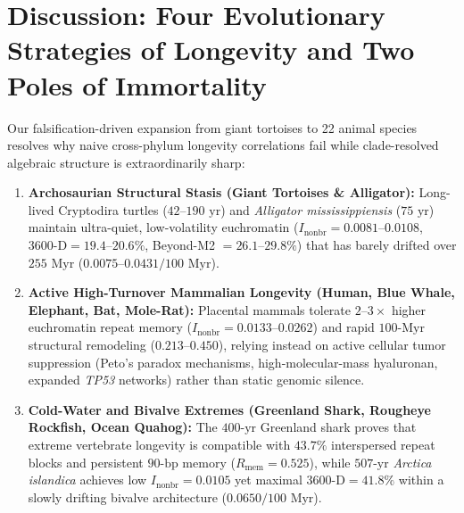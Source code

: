 \documentclass[11pt,a4paper]{article}
\renewcommand{\_}{\origunderscore\penalty200\relax}
\theoremstyle{remark}
\begin{document}
\section{Discussion: Four Evolutionary Strategies of Longevity and Two Poles of Immortality}
Our falsification-driven expansion from giant tortoises to 22 animal species resolves why naive cross-phylum longevity correlations fail while clade-resolved algebraic structure is extraordinarily sharp:
\begin{enumerate}
  \item \textbf{Archosaurian Structural Stasis (Giant Tortoises \& Alligator):} Long-lived Cryptodira turtles ($42\text{--}190\text{ yr}$) and \textit{Alligator mississippiensis} ($75\text{ yr}$) maintain ultra-quiet, low-volatility euchromatin ($I_{\mathrm{nonbr}} = 0.0081\text{--}0.0108$, $3600\text{-D} = 19.4\text{--}20.6\%$, Beyond-M2 $= 26.1\text{--}29.8\%$) that has barely drifted over $255\text{ Myr}$ ($0.0075\text{--}0.0431 / 100\text{ Myr}$).
  \item \textbf{Active High-Turnover Mammalian Longevity (Human, Blue Whale, Elephant, Bat, Mole-Rat):} Placental mammals tolerate $2\text{--}3\times$ higher euchromatin repeat memory ($I_{\mathrm{nonbr}} = 0.0133\text{--}0.0262$) and rapid $100\text{-Myr}$ structural remodeling ($0.213\text{--}0.450$), relying instead on active cellular tumor suppression (Peto's paradox mechanisms, high-molecular-mass hyaluronan, expanded \textit{TP53} networks) rather than static genomic silence.
  \item \textbf{Cold-Water and Bivalve Extremes (Greenland Shark, Rougheye Rockfish, Ocean Quahog):} The $400\text{-yr}$ Greenland shark proves that extreme vertebrate longevity is compatible with $43.7\%$ interspersed repeat blocks and persistent $90\text{-bp}$ memory ($R_{\mathrm{mem}}=0.525$), while $507\text{-yr}$ \textit{Arctica islandica} achieves low $I_{\mathrm{nonbr}}=0.0105$ yet maximal $3600\text{-D}=41.8\%$ within a slowly drifting bivalve architecture ($0.0650 / 100\text{ Myr}$).

\end{enumerate}
\end{document}
